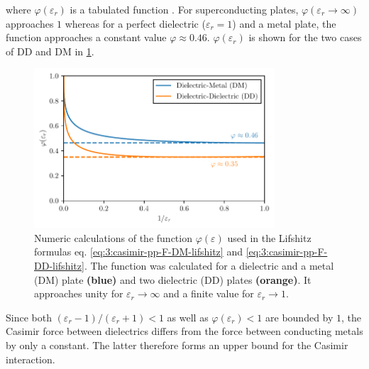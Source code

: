 where $\varphi(\varepsilon_r)$ is a tabulated function \cite{Lifshitz_1956}. 
For superconducting plates, $\varphi(\varepsilon_r \rightarrow \infty)$ approaches $1$ whereas for a perfect dielectric ($\varepsilon_r = 1$) and a metal plate, the function approaches a constant value $\varphi \approx 0.46$.
$\varphi(\varepsilon_r)$ is shown for the two cases of DD and DM in \cref{fig:3:lifshitz-function}.
\begin{figure}[!htbp]
  \centering
  \includegraphics[width=0.8\textwidth]{./../figures/casimir/casimir-lifshitz-function.pdf}
  \caption{Numeric calculations of the function $\varphi(\varepsilon)$ used in the Lifshitz formulas eq. \eqref{eq:3:casimir-pp-F-DM-lifshitz} and \eqref{eq:3:casimir-pp-F-DD-lifshitz}. The function was calculated for a dielectric and a metal (DM) plate \textbf{(blue)} and two dielectric (DD) plates \textbf{(orange)}. It approaches unity for $\varepsilon_r\rightarrow\infty$ and a finite value for $\varepsilon_r\rightarrow 1$.}
  \label{fig:3:lifshitz-function}
\end{figure}
Since both $(\varepsilon_r - 1)/(\varepsilon_r + 1) < 1$ as well as $\varphi(\varepsilon_r) < 1$ are bounded by $1$, the Casimir force between dielectrics differs from the force between conducting metals by only a constant.
The latter therefore forms an upper bound for the Casimir interaction.





